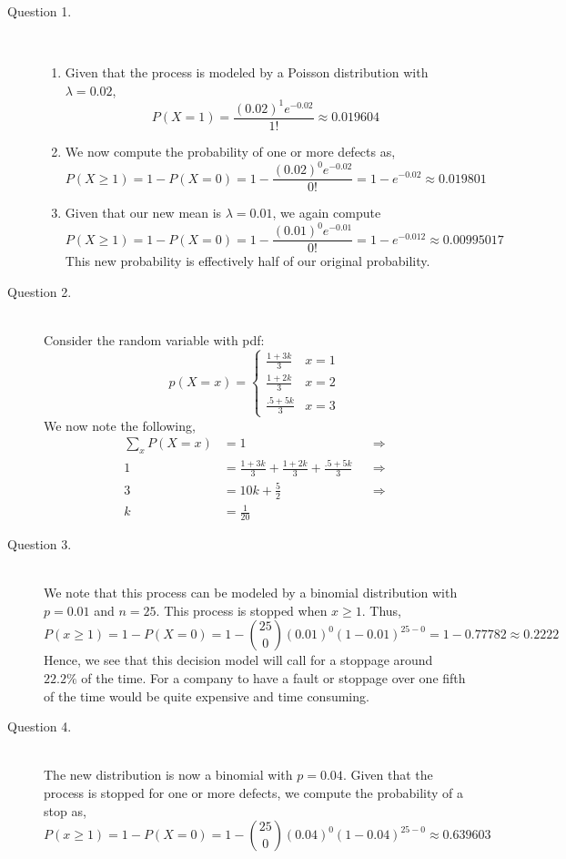 \documentclass[letterpaper,10pt]{article}
\begin{document}
\begin{description}
\item[Question 1.]\hfill \\
\begin{enumerate}[label=\alph*.]
\item Given that the process is modeled by a Poisson distribution with $\lambda=0.02$,
\[P(X=1)=\frac{(0.02)^1e^{-0.02}}{1!}\approx 0.019604\]
\item We now compute the probability of one or more defects as,
\[P(X\geq 1)=1-P(X=0)=1-\frac{(0.02)^0e^{-0.02}}{0!}=1-e^{-0.02}\approx 0.019801\]
\item Given that our new mean is $\lambda=0.01$, we again compute
\[P(X\geq 1)=1-P(X=0)=1-\frac{(0.01)^0e^{-0.01}}{0!}=1-e^{-0.012}\approx 0.00995017\]
This new probability is effectively half of our original probability.
\end{enumerate}
\item[Question 2.]\hfill \\
Consider the random variable with pdf:
\[p(X=x)=\begin{cases}
\frac{1+3k}{3} & x=1\\
\frac{1+2k}{3} & x=2\\
\frac{.5+5k}{3} & x=3
\end{cases}\]
We now note the following,
\begin{align*}
\sum_{x}P(X=x)&=1 && \Rightarrow\\
1 &= \frac{1+3k}{3}+\frac{1+2k}{3}+\frac{.5+5k}{3} && \Rightarrow\\
3 &= 10k+\frac{5}{2} && \Rightarrow\\
k &= \frac{1}{20}
\end{align*}
\item[Question 3.]\hfill \\
We note that this process can be modeled by a binomial distribution with $p=0.01$ and $n=25$. This process is stopped when $x\geq 1$. Thus,
\[P(x\geq 1)=1-P(X=0)=1-{25\choose 0}(0.01)^0(1-0.01)^{25-0}=1-0.77782\approx 0.2222\]
Hence, we see that this decision model will call for a stoppage around $22.2\%$ of the time. For a company to have a fault or stoppage over one fifth of the time would be quite expensive and time consuming.
\item[Question 4.]\hfill \\
The new distribution is now a binomial with $p=0.04$. Given that the process is stopped for one or more defects, we compute the probability of a stop as,
\[P(x\geq 1)=1-P(X=0)=1-{25\choose 0}(0.04)^0(1-0.04)^{25-0}\approx 0.639603\]

\end{description}
\end{document}
